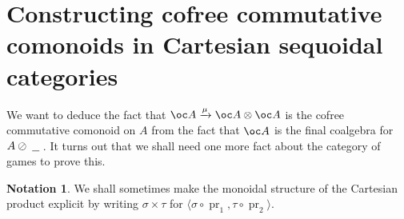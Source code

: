 \documentclass[a4paper,UKenglish]{lipics-v2016}
\theoremstyle{plain}
\theoremstyle{definition}
\newtheorem{notation}[theorem]{Notation}
\DeclareMathOperator{\pr}{pr}
\newcommand{\tensor}{\otimes}
\newcommand{\sequoid}{\oslash}
\newcommand{\comp}[2]{#1 \circ #2}
\newcommand{\blank}{\;\underline{\hspace{1.5ex}}\;}
\newlength{\arrow}
\begin{document}
\section{Constructing cofree commutative comonoids in Cartesian sequoidal categories}

We want to deduce the fact that $\oc A\xrightarrow{\mu}\oc A\tensor\oc A$ is the cofree commutative comonoid on $A$ from the fact that $\oc A$ is the final coalgebra for $A\sequoid\blank$.  It turns out that we shall need one more fact about the category of games to prove this.

\begin{notation}
  We shall sometimes make the monoidal structure of the Cartesian product explicit by writing $\sigma\times\tau$ for $\langle\comp\sigma{\pr_1},\comp\tau{\pr_2}\rangle$.
\end{notation}
\end{document}
